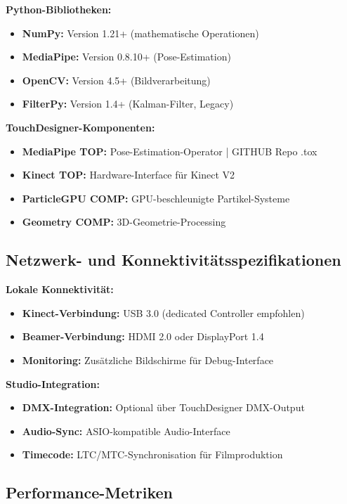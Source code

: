 \textbf{Python-Bibliotheken:}
\begin{itemize}
    \item \textbf{NumPy:} Version 1.21+ (mathematische Operationen)
    \item \textbf{MediaPipe:} Version 0.8.10+ (Pose-Estimation)
    \item \textbf{OpenCV:} Version 4.5+ (Bildverarbeitung)
    \item \textbf{FilterPy:} Version 1.4+ (Kalman-Filter, Legacy)
\end{itemize}

\textbf{TouchDesigner-Komponenten:}
\begin{itemize}
    \item \textbf{MediaPipe TOP:} Pose-Estimation-Operator | GITHUB Repo .tox
    \item \textbf{Kinect TOP:} Hardware-Interface für Kinect V2
    \item \textbf{ParticleGPU COMP:} GPU-beschleunigte Partikel-Systeme
    \item \textbf{Geometry COMP:} 3D-Geometrie-Processing
\end{itemize}

\subsection{Netzwerk- und Konnektivitätsspezifikationen}

\textbf{Lokale Konnektivität:}
\begin{itemize}
    \item \textbf{Kinect-Verbindung:} USB 3.0 (dedicated Controller empfohlen)
    \item \textbf{Beamer-Verbindung:} HDMI 2.0 oder DisplayPort 1.4
    \item \textbf{Monitoring:} Zusätzliche Bildschirme für Debug-Interface
\end{itemize}

\textbf{Studio-Integration:}
\begin{itemize}
    \item \textbf{DMX-Integration:} Optional über TouchDesigner DMX-Output
    \item \textbf{Audio-Sync:} ASIO-kompatible Audio-Interface
    \item \textbf{Timecode:} LTC/MTC-Synchronisation für Filmproduktion
\end{itemize}

\subsection{Performance-Metriken}


